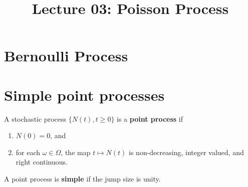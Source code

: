 \documentclass[a4paper,10pt,english]{article}
\title{Lecture 03: Poisson Process}
\author{}
\begin{document}
\maketitle

\section{Bernoulli Process}


\section{Simple point processes}
A stochastic process $\{N(t), t\geqslant 0\}$ is a \textbf{point process} if
\begin{enumerate}
  \item $N(0) = 0$, and 
  \item for each $\omega \in \Omega$, the map $t\mapsto N(t)$ is non-decreasing, integer valued, and right continuous.%
\end{enumerate}
A point process is \textbf{simple} if the jump size is unity.
\end{document}
